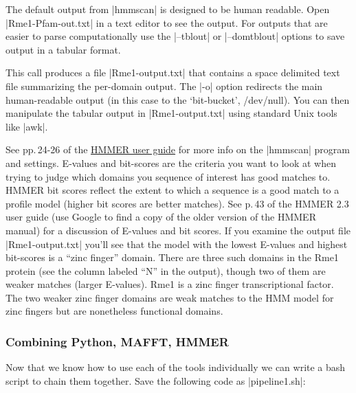 The default output from |hmmscan| is designed to be human readable. Open |Rme1-Pfam-out.txt| in a text editor to see the output. For outputs that are easier to parse computationally use the |--tblout| or |--domtblout| options to save output in a tabular format.


This call produces a file |Rme1-output.txt| that contains a space delimited text file summarizing the per-domain output. The |-o| option redirects the main human-readable output (in this case to the `bit-bucket', /dev/null). You can then manipulate the tabular output in |Rme1-output.txt| using standard Unix tools like |awk|.

See pp.\,24-26  of the \href{ftp://selab.janelia.org/pub/software/hmmer3/3.0/Userguide.pdf}{HMMER user guide} for more info on the |hmmscan| program and settings. E-values and bit-scores are the criteria you want to look at when trying to judge which domains you sequence of interest has good matches to.  HMMER bit scores reflect the extent to which a sequence is a good match to a  profile model (higher bit scores are better matches). See p.\,43 of the HMMER 2.3 user guide (use Google to find a copy of the older version of the HMMER manual) for a discussion of E-values and bit scores.  If you examine the output file |Rme1-output.txt| you'll see that the model with the lowest E-values and highest bit-scores is a ``zinc finger'' domain.  There are three such domains in the Rme1 protein (see the column labeled ``N'' in the output), though two of them are weaker matches (larger E-values). Rme1 is a zinc finger transcriptional factor. The two weaker zinc finger domains are weak matches to the HMM model for zinc fingers but are nonetheless functional domains.

\subsubsection{Combining Python, MAFFT, HMMER}

Now that we know how to use each of the tools individually we can write a bash script to chain them together.  Save the following code as |pipeline1.sh|:

